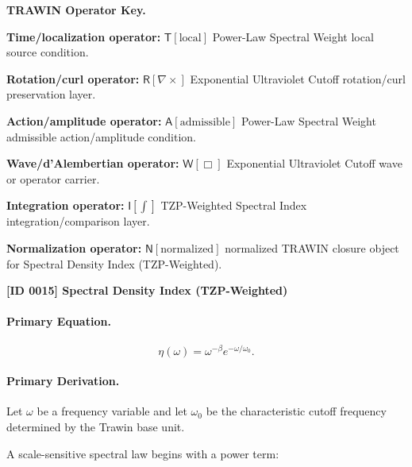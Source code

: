\par\vspace{0.45\baselineskip}
\noindent\begin{minipage}[t]{\linewidth}
\begingroup
\small
\raggedright
\textbf{TRAWIN Operator Key.}\par
\noindent\textbf{Time/localization operator:} $\mathsf{T}\!\left[\mathrm{local}\right]$ Power-Law Spectral Weight local source condition.\par
\noindent\textbf{Rotation/curl operator:} $\mathsf{R}\!\left[\nabla\times\right]$ Exponential Ultraviolet Cutoff rotation/curl preservation layer.\par
\noindent\textbf{Action/amplitude operator:} $\mathsf{A}\!\left[\mathrm{admissible}\right]$ Power-Law Spectral Weight admissible action/amplitude condition.\par
\noindent\textbf{Wave/d'Alembertian operator:} $\mathsf{W}\!\left[\Box\right]$ Exponential Ultraviolet Cutoff wave or operator carrier.\par
\noindent\textbf{Integration operator:} $\mathsf{I}\!\left[\int\right]$ TZP-Weighted Spectral Index integration/comparison layer.\par
\noindent\textbf{Normalization operator:} $\mathsf{N}\!\left[\mathrm{normalized}\right]$ normalized TRAWIN closure object for Spectral Density Index (TZP-Weighted).\par
\endgroup
\end{minipage}

\clearpage
\noindent\textbf{[ID 0015] Spectral Density Index (TZP-Weighted)}\par
\vspace{0.35em}
\paragraph{Primary Equation.}
\begin{equation}
\eta(\omega)
=
\omega^{-\beta}
e^{-\omega/\omega_0}.
\end{equation}

\paragraph{Primary Derivation.}
Let $\omega$ be a frequency variable and let $\omega_0$ be the characteristic cutoff frequency determined by the Trawin base unit.

A scale-sensitive spectral law begins with a power term:

